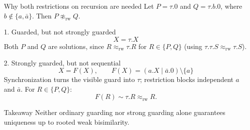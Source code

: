 \documentclass[handout,aspectratio=169,11pt]{beamer}
\newcommand{\rwb}{\mathrel{\approx_{\mathrm{rw}}}}
\newcommand{\nil}{\mathbf 0}
\newcommand{\Source}[1]{\par\vspace{2mm}{\scriptsize\color{Muted}#1\par}}
\begin{document}
\begin{frame}{Why both restrictions on recursion are needed}
  \footnotesize
  Let $P=\tau.0$ and $Q=\tau.b.0$, where
  $b\notin\{a,\bar a\}$. Then $P\not\approx_{\mathrm{rw}}Q$.

  \begin{block}{1. Guarded, but not strongly guarded}
    \[
      X=\tau.X
    \]
    Both $P$ and $Q$ are solutions, since
    $R\approx_{\mathrm{rw}}\tau.R$ for $R\in\{P,Q\}$
    (using $\tau.\tau.S\approx_{\mathrm{rw}}\tau.S$).
  \end{block}

  \begin{block}{2. Strongly guarded, but not sequential}
    \[
      X=F(X),\qquad
      F(X)=(a.X\mid\bar a.0)\setminus\{a\}
    \]
    Synchronization turns the visible guard into $\tau$;
    restriction blocks independent $a$ and $\bar a$.
    For $R\in\{P,Q\}$:
    \[
       F(R)\sim\tau.R\approx_{\mathrm{rw}}R.
    \]
  \end{block}

  \begin{alertblock}{Takeaway}
    Neither ordinary guarding nor strong guarding alone
    guarantees uniqueness up to rooted weak bisimilarity.
  \end{alertblock}
\end{frame}

\end{document}
